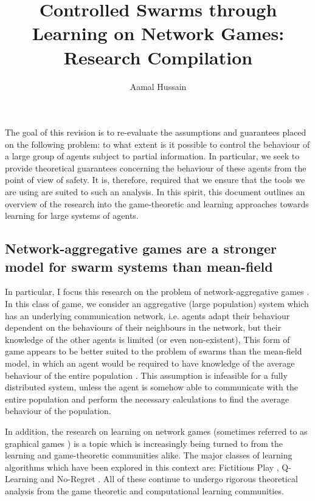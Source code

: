 \documentclass{article}
\title{Controlled Swarms through Learning on Network Games: Research Compilation}
\author{Aamal Hussain}
\date{}
\begin{document}
    \maketitle

The goal of this revision is to re-evaluate the assumptions and
guarantees placed on the following problem: to what extent is it
possible to control the behaviour of a large group of agents subject
to partial information. In particular, we seek to provide theoretical
guarantees concerning the behaviour of these agents from the point of
view of safety. It is, therefore, required that we ensure that the
tools we are using are suited to such an analysis. In this spirit,
this document outlines an overview of the research into the
game-theoretic and learning approaches towards learning for large
systems of agents.


\subsection*{Network-aggregative games are a stronger model for swarm systems than mean-field}

In particular, I focus this research on the problem of
network-aggregative games \cite{Parise}. In this class of game, we
consider an aggregative (large population) system which has an
underlying communication network, i.e. agents adapt their behaviour
dependent on the behaviours of their neighbours in the network, but
their knowledge of the other agents is limited (or even non-existent),
This form of game appears to be better suited to the problem of swarms
than the mean-field model, in which an agent would be required to have
knowledge of the average behaviour of the entire population
\cite{Paccagnan2019}. This assumption is infeasible for a fully
distributed system, unless the agent is somehow able to communicate
with the entire population and perform the necessary calculations to
find the average behaviour of the population.


In addition, the research on learning on network games (sometimes referred to as graphical games
\cite{Li2017}) is a topic which is increasingly being turned to from the
learning and game-theoretic communities alike. The major classes of learning algorithms which have
been explored in this context are: Fictitious Play \cite{Ewerhart2019}, Q-Learning 
\cite{Vamvoudakis2017} and No-Regret \cite{Nagarajan2018}. All
of these continue to undergo rigorous theoretical analysis from the game theoretic and computational
learning communities. 
\end{document}
